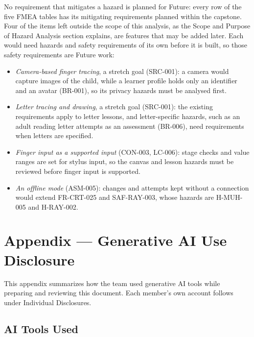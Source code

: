 \documentclass{article}
\begin{document}
No requirement that mitigates a hazard is planned for Future: every row of the five FMEA
tables has its mitigating requirements planned within the capstone. Four of the
items left outside the scope of this analysis, as the Scope and Purpose of
Hazard Analysis section explains, are features that may be added later. Each
would need hazards and safety requirements of its own before it is built, so
those safety requirements are Future work:
\begin{itemize}
  \item \emph{Camera-based finger tracing}, a stretch goal (SRC-001): a camera
  would capture images of the child, while a learner profile holds only an
  identifier and an avatar (BR-001), so its privacy hazards must be
  analysed first.
  \item \emph{Letter tracing and drawing}, a stretch goal (SRC-001): the
  existing requirements apply to letter lessons, and letter-specific hazards,
  such as an adult reading letter attempts as an assessment (BR-006), need
  requirements when letters are specified.
  \item \emph{Finger input as a supported input} (CON-003, LC-006): stage checks
  and value ranges are set for stylus input, so the canvas and lesson hazards
  must be reviewed before finger input is supported.
  \item \emph{An offline mode} (ASM-005): changes and attempts kept without a
  connection would extend FR-CRT-025 and SAF-RAY-003, whose hazards are
  H-MUH-005 and H-RAY-002.
\end{itemize}




\newpage{}

\section{Appendix --- Generative AI Use Disclosure}

This appendix summarizes how the team used generative AI tools while
preparing and reviewing this document. Each member's own account follows
under Individual Disclosures.

\subsection{AI Tools Used}
\end{document}
